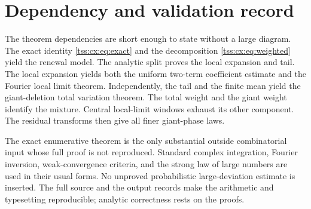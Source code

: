 \documentclass[11pt]{article}
\theoremstyle{remark}\newtheorem{remark}[theorem]{Remark}
\theoremstyle{definition}\newtheorem{definition}[theorem]{Definition}
\begin{document}
\section{Dependency and validation record}
The theorem dependencies are short enough to state without a
large diagram. The exact identity \eqref{tss:cx:eq:exact} and the
decomposition \eqref{tss:cx:eq:weighted} yield the renewal model. The
analytic split proves the local expansion and tail. The local
expansion yields both the uniform two-term coefficient estimate
and the Fourier local limit theorem. Independently, the tail and
the finite mean yield the giant-deletion total variation theorem.
The total weight and the giant weight identify the mixture.
Central local-limit windows exhaust its other component. The
residual transforms then give all finer giant-phase laws.

The exact enumerative theorem is the only substantial outside
combinatorial input whose full proof is not reproduced. Standard
complex integration, Fourier inversion, weak-convergence criteria,
and the strong law of large numbers are used in their usual forms.
No unproved probabilistic large-deviation estimate is inserted.
The full source and the output records make the arithmetic and
typesetting reproducible; analytic correctness rests on the proofs.


\clearpage
{}
\end{document}
